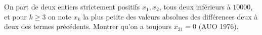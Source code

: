 On part de deux entiers strictement positifs $x_1, x_2$, tous deux inférieurs à $10000$, et pour $k \geq 3$ on note $x_k$ la plus petite des valeurs absolues des différences deux à deux des termes précédents. Montrer qu'on a toujours $x_{21} = 0$ (AUO 1976).
